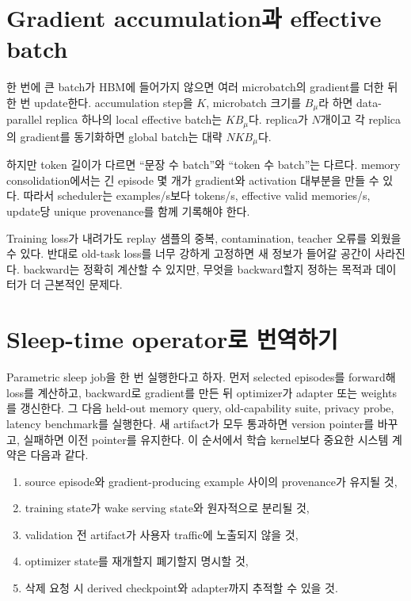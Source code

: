 \section{Gradient accumulation과 effective batch}

한 번에 큰 batch가 HBM에 들어가지 않으면 여러 microbatch의 gradient를 더한 뒤 한 번
update한다. accumulation step을 $K$, microbatch 크기를 $B_\mu$라 하면 data-parallel replica
하나의 local effective batch는 $K B_\mu$다. replica가 $N$개이고 각 replica의 gradient를
동기화하면 global batch는 대략 $NKB_\mu$다.

하지만 token 길이가 다르면 ``문장 수 batch''와 ``token 수 batch''는 다르다. memory
consolidation에서는 긴 episode 몇 개가 gradient와 activation 대부분을 만들 수 있다.
따라서 scheduler는 examples/s보다 tokens/s, effective valid memories/s, update당 unique
provenance를 함께 기록해야 한다.

\begin{cautionbox}
Training loss가 내려가도 replay 샘플의 중복, contamination, teacher 오류를 외웠을 수 있다.
반대로 old-task loss를 너무 강하게 고정하면 새 정보가 들어갈 공간이 사라진다. backward는
정확히 계산할 수 있지만, 무엇을 backward할지 정하는 목적과 데이터가 더 근본적인 문제다.
\end{cautionbox}

\section{Sleep-time operator로 번역하기}

Parametric sleep job을 한 번 실행한다고 하자. 먼저 selected episodes를 forward해 loss를
계산하고, backward로 gradient를 만든 뒤 optimizer가 adapter 또는 weights를 갱신한다.
그 다음 held-out memory query, old-capability suite, privacy probe, latency benchmark를
실행한다. 새 artifact가 모두 통과하면 version pointer를 바꾸고, 실패하면 이전 pointer를
유지한다. 이 순서에서 학습 kernel보다 중요한 시스템 계약은 다음과 같다.

\begin{enumerate}
  \item source episode와 gradient-producing example 사이의 provenance가 유지될 것,
  \item training state가 wake serving state와 원자적으로 분리될 것,
  \item validation 전 artifact가 사용자 traffic에 노출되지 않을 것,
  \item optimizer state를 재개할지 폐기할지 명시할 것,
  \item 삭제 요청 시 derived checkpoint와 adapter까지 추적할 수 있을 것.
\end{enumerate}
